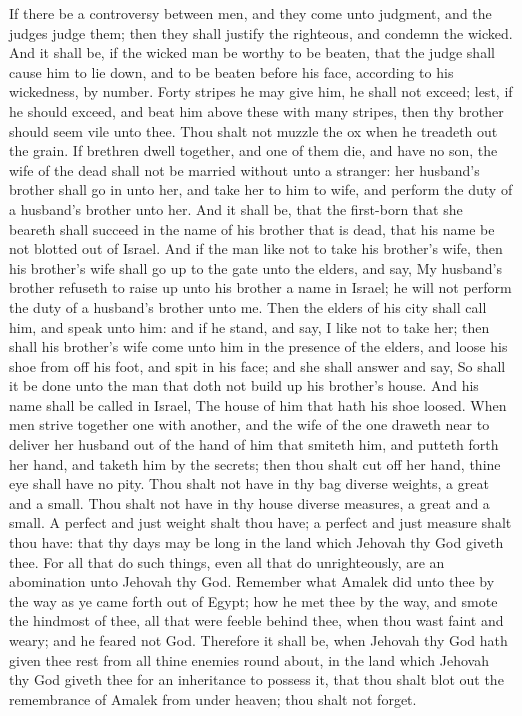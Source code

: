 If there be a controversy between men, and they come unto judgment, and the judges judge them; then they shall justify the righteous, and condemn the wicked. And it shall be, if the wicked man be worthy to be beaten, that the judge shall cause him to lie down, and to be beaten before his face, according to his wickedness, by number. Forty stripes he may give him, he shall not exceed; lest, if he should exceed, and beat him above these with many stripes, then thy brother should seem vile unto thee.  Thou shalt not muzzle the ox when he treadeth out the grain.  If brethren dwell together, and one of them die, and have no son, the wife of the dead shall not be married without unto a stranger: her husband’s brother shall go in unto her, and take her to him to wife, and perform the duty of a husband’s brother unto her. And it shall be, that the first-born that she beareth shall succeed in the name of his brother that is dead, that his name be not blotted out of Israel. And if the man like not to take his brother’s wife, then his brother’s wife shall go up to the gate unto the elders, and say, My husband’s brother refuseth to raise up unto his brother a name in Israel; he will not perform the duty of a husband’s brother unto me. Then the elders of his city shall call him, and speak unto him: and if he stand, and say, I like not to take her; then shall his brother’s wife come unto him in the presence of the elders, and loose his shoe from off his foot, and spit in his face; and she shall answer and say, So shall it be done unto the man that doth not build up his brother’s house. And his name shall be called in Israel, The house of him that hath his shoe loosed.  When men strive together one with another, and the wife of the one draweth near to deliver her husband out of the hand of him that smiteth him, and putteth forth her hand, and taketh him by the secrets; then thou shalt cut off her hand, thine eye shall have no pity.  Thou shalt not have in thy bag diverse weights, a great and a small. Thou shalt not have in thy house diverse measures, a great and a small. A perfect and just weight shalt thou have; a perfect and just measure shalt thou have: that thy days may be long in the land which Jehovah thy God giveth thee. For all that do such things, even all that do unrighteously, are an abomination unto Jehovah thy God.  Remember what Amalek did unto thee by the way as ye came forth out of Egypt; how he met thee by the way, and smote the hindmost of thee, all that were feeble behind thee, when thou wast faint and weary; and he feared not God. Therefore it shall be, when Jehovah thy God hath given thee rest from all thine enemies round about, in the land which Jehovah thy God giveth thee for an inheritance to possess it, that thou shalt blot out the remembrance of Amalek from under heaven; thou shalt not forget. 

